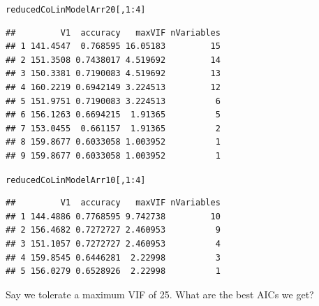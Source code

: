 \documentclass[a4paper]{article}\usepackage[]{graphicx}\usepackage[]{color}
\makeatletter
\newcommand{\hlnum}[1]{\textcolor[rgb]{0.686,0.059,0.569}{#1}}%
\newcommand{\hlopt}[1]{\textcolor[rgb]{0,0,0}{#1}}%
\newcommand{\hlstd}[1]{\textcolor[rgb]{0.345,0.345,0.345}{#1}}%
\newenvironment{kframe}{%
 \def\at@end@of@kframe{}%
 \ifinner\ifhmode%
  \def\at@end@of@kframe{\end{minipage}}%
  \begin{minipage}{\columnwidth}%
 \fi\fi%
 \def\FrameCommand##1{\hskip\@totalleftmargin \hskip-\fboxsep
 \colorbox{shadecolor}{##1}\hskip-\fboxsep
     \hskip-\linewidth \hskip-\@totalleftmargin \hskip\columnwidth}%
 \MakeFramed {\advance\hsize-\width
   \@totalleftmargin\z@ \linewidth\hsize
   \@setminipage}}%
 {\par\unskip\endMakeFramed%
 \at@end@of@kframe}
\newenvironment{knitrout}{}{} %
\makeatother
\begin{document}
\begin{knitrout}
\begin{kframe}
\begin{verbatim}
\end{verbatim}
\begin{alltt}
\hlstd{reducedCoLinModelArr20[,}\hlnum{1}\hlopt{:}\hlnum{4}\hlstd{]}
\end{alltt}
\begin{verbatim}
##         V1  accuracy   maxVIF nVariables
## 1 141.4547  0.768595 16.05183         15
## 2 151.3508 0.7438017 4.519692         14
## 3 150.3381 0.7190083 4.519692         13
## 4 160.2219 0.6942149 3.224513         12
## 5 151.9751 0.7190083 3.224513          6
## 6 156.1263 0.6694215  1.91365          5
## 7 153.0455  0.661157  1.91365          2
## 8 159.8677 0.6033058 1.003952          1
## 9 159.8677 0.6033058 1.003952          1
\end{verbatim}
\begin{alltt}
\hlstd{reducedCoLinModelArr10[,}\hlnum{1}\hlopt{:}\hlnum{4}\hlstd{]}
\end{alltt}
\begin{verbatim}
##         V1  accuracy   maxVIF nVariables
## 1 144.4886 0.7768595 9.742738         10
## 2 156.4682 0.7272727 2.460953          9
## 3 151.1057 0.7272727 2.460953          4
## 4 159.8545 0.6446281  2.22998          3
## 5 156.0279 0.6528926  2.22998          1
\end{verbatim}
\end{kframe}
\end{knitrout}

Say we tolerate a maximum VIF of 25. What are the best AICs we get?
\end{document}
